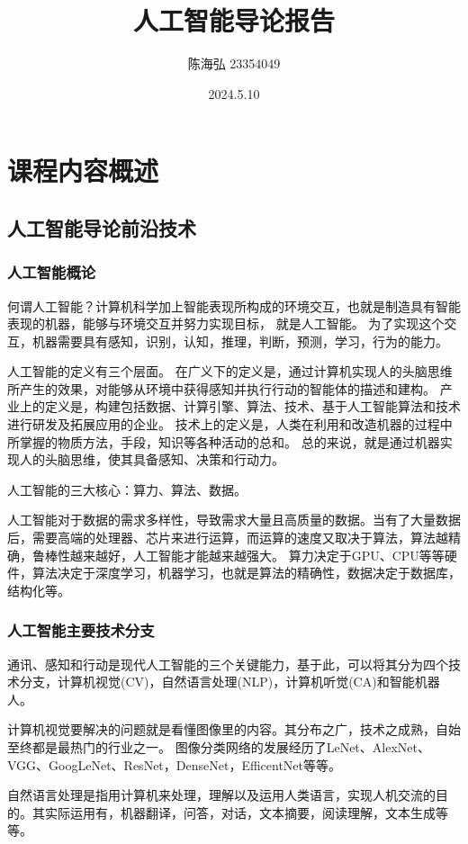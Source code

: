 \documentclass[12pt,a4paper,oneside]{article}
\title{人工智能导论报告}
\author{陈海弘 23354049}
\date{2024.5.10}
\begin{document}
\maketitle

\newpage
\tableofcontents
\section{课程内容概述}
\subsection{人工智能导论前沿技术}
\subsubsection{人工智能概论}
何谓人工智能？计算机科学加上智能表现所构成的环境交互，也就是制造具有智能表现的机器，能够与环境交互并努力实现目标， 就是人工智能。
为了实现这个交互，机器需要具有感知，识别，认知，推理，判断，预测，学习，行为的能力。

人工智能的定义有三个层面。
在广义下的定义是，通过计算机实现人的头脑思维所产生的效果，对能够从环境中获得感知并执行行动的智能体的描述和建构。
产业上的定义是，构建包括数据、计算引擎、算法、技术、基于人工智能算法和技术进行研发及拓展应用的企业。
技术上的定义是，人类在利用和改造机器的过程中所掌握的物质方法，手段，知识等各种活动的总和。
总的来说，就是通过机器实现人的头脑思维，使其具备感知、决策和行动力。

人工智能的三大核心：算力、算法、数据。

人工智能对于数据的需求多样性，导致需求大量且高质量的数据。当有了大量数据后，需要高端的处理器、芯片来进行运算，而运算的速度又取决于算法，算法越精确，鲁棒性越来越好，人工智能才能越来越强大。
算力决定于GPU、CPU等等硬件，算法决定于深度学习，机器学习，也就是算法的精确性，数据决定于数据库，结构化等。
\subsubsection{人工智能主要技术分支}
通讯、感知和行动是现代人工智能的三个关键能力，基于此，可以将其分为四个技术分支，计算机视觉(CV)，自然语言处理(NLP)，计算机听觉(CA)和智能机器人。

计算机视觉要解决的问题就是看懂图像里的内容。其分布之广，技术之成熟，自始至终都是最热门的行业之一。
图像分类网络的发展经历了LeNet、AlexNet、VGG、GoogLeNet、ResNet，DenseNet，EfficentNet等等。

自然语言处理是指用计算机来处理，理解以及运用人类语言，实现人机交流的目的。其实际运用有，机器翻译，问答，对话，文本摘要，阅读理解，文本生成等等。
\end{document}
